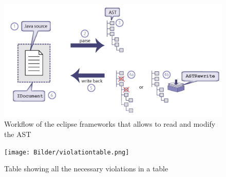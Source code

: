\begin{figure}
\centering
\includegraphics{Bilder/workflowAST.png}
\caption[Workflow of the eclipse frameworks that allows to read and modify the \acf{AST}]{Workflow of the eclipse frameworks that allows to read and modify the \acf{AST}}
\label{picture:workflowast}
\end{figure}

\begin{figure}
\centering
\texttt{[image: Bilder/violationtable.png]}
\caption[Table showing all the necessary violations in a table]{Table showing all the necessary violations in a table}
\label{picture:violationtable}
\end{figure}
